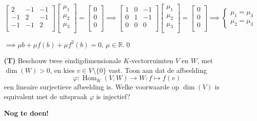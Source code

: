 \begin{oefening}[3.2.4]
\begin{enumerate}
        \(\begin{bmatrix}
            2 & -1 & -1 \\
            -1 & 2 & -1 \\
            -1 & -1 & 2 \\
        \end{bmatrix}
        \begin{bmatrix}
            \mu_1 \\
            \mu_2\\
            \mu_3\\
        \end{bmatrix}
        = \begin{bmatrix}
            0 \\
            0\\
            0\\
        \end{bmatrix}
        \implies 
        \begin{bmatrix}
            1 & 0 & -1 \\
            0 & 1 & -1 \\
            0 & 0 & 0 \\
        \end{bmatrix}
        \begin{bmatrix}
            \mu_1 \\
            \mu_2\\
            \mu_3\\
        \end{bmatrix}
        = \begin{bmatrix}
            0 \\
            0\\
            0\\
        \end{bmatrix}
        \implies 
        \begin{cases}
            \mu_1 = \mu_3 \\
            \mu_2 = \mu_3
        \end{cases}\)

        \(
        \implies \mu b + \mu f(b) + \mu f^2(b) = 0, \, \mu \in \mathds{R}.
        \)\qed
    \end{enumerate}
\end{oefening}

\begin{oefening}[3.4.5] \textbf{(T)}
    Beschouw twee eindigdimensionale $K$-vectorruimten $V$ en $W$, met $\dim(W) > 0$, en kies $v \in V \setminus \{0\}$ vast. Toon aan dat de afbeelding
    \[ \varphi \colon \operatorname{Hom}_K(V, W) \to W \colon f \mapsto f(v) \]
    een lineaire surjectieve afbeelding is. Welke voorwaarde op $\dim(V)$ is equivalent met de uitspraak $\varphi$ is injectief?

    \textbf{Nog te doen!}

\end{oefening}

